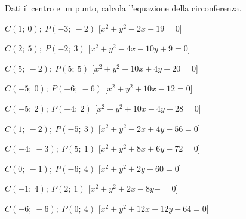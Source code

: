 

\begin{esercizio}\label{ese:}
 Dati il centro e un punto, calcola l'equazione della circonferenza.
 \begin{enumeratea}
  \item  \(C \left (1;~0 \right );~P \left (-3;~-2 \right )\)
   \hfill [\(x^2 + y^2 -2x -19 = 0\)]
  \item  \(C \left (2;~5 \right );~P \left (-2;~3 \right )\)
   \hfill [\(x^2 + y^2 -4x -10y +9 = 0\)]
  \item  \(C \left (5;~-2 \right );~P \left (5;~5 \right )\)
   \hfill [\(x^2 + y^2 -10x +4y -20 = 0\)]
  \item  \(C \left (-5;~0 \right );~P \left (-6;~-6 \right )\)
   \hfill [\(x^2 + y^2 +10x -12 = 0\)]
  \item  \(C \left (-5;~2 \right );~P \left (-4;~2 \right )\)
   \hfill [\(x^2 + y^2 +10x -4y +28 = 0\)]
  \item  \(C \left (1;~-2 \right );~P \left (-5;~3 \right )\)
   \hfill [\(x^2 + y^2 -2x +4y -56 = 0\)]
  \item  \(C \left (-4;~-3 \right );~P \left (5;~1 \right )\)
   \hfill [\(x^2 + y^2 +8x +6y -72 = 0\)]
  \item  \(C \left (0;~-1 \right );~P \left (-6;~4 \right )\)
   \hfill [\(x^2 + y^2 +2y -60 = 0\)]
  \item  \(C \left (-1;~4 \right );~P \left (2;~1 \right )\)
   \hfill [\(x^2 + y^2 +2x -8y - = 0\)]
  \item  \(C \left (-6;~-6 \right );~P \left (0;~4 \right )\)
   \hfill [\(x^2 + y^2 +12x +12y -64 = 0\)]
 \end{enumeratea}
\end{esercizio}



